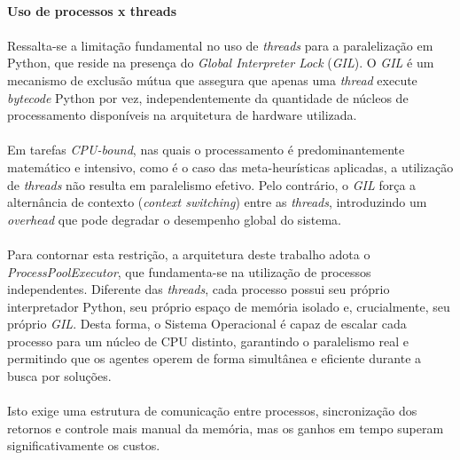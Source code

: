 \paragraph{Uso de processos x threads} 

\paragraph{} Ressalta-se a limitação fundamental no uso de \textit{threads} para a paralelização em Python, que reside na presença do \textit{Global Interpreter Lock} (\textit{GIL}). O \textit{GIL} é um mecanismo de exclusão mútua que assegura que apenas uma \textit{thread} execute \textit{bytecode} Python por vez, independentemente da quantidade de núcleos de processamento disponíveis na arquitetura de hardware utilizada. 

\paragraph{} Em tarefas \textit{CPU-bound}, nas quais o processamento é predominantemente matemático e intensivo, como é o caso das meta-heurísticas aplicadas, a utilização de \textit{threads} não resulta em paralelismo efetivo. Pelo contrário, o \textit{GIL} força a alternância de contexto (\textit{context switching}) entre as \textit{threads}, introduzindo um \textit{overhead} que pode degradar o desempenho global do sistema.

\paragraph{} Para contornar esta restrição, a arquitetura deste trabalho adota o \textit{ProcessPoolExecutor}, que fundamenta-se na utilização de processos independentes. Diferente das \textit{threads}, cada processo possui seu próprio interpretador Python, seu próprio espaço de memória isolado e, crucialmente, seu próprio \textit{GIL}. Desta forma, o Sistema Operacional é capaz de escalar cada processo para um núcleo de CPU distinto, garantindo o paralelismo real e permitindo que os agentes operem de forma simultânea e eficiente durante a busca por soluções.

\paragraph{} Isto exige uma estrutura de comunicação entre processos, sincronização dos retornos e controle mais manual da memória, mas os ganhos em tempo superam significativamente os custos.

